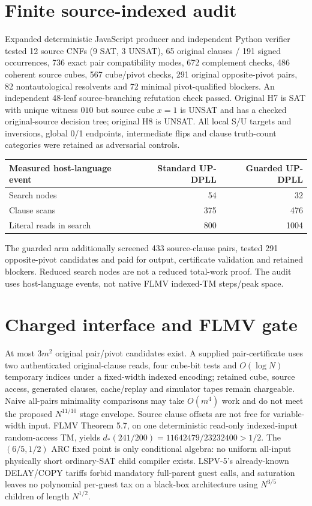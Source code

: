 \documentclass[11pt]{article}
\begin{document}
\section{Finite source-indexed audit}
Expanded deterministic JavaScript producer and independent Python verifier tested 12 source CNFs (9 SAT, 3 UNSAT), 65 original clauses / 191 signed occurrences, 736 exact pair compatibility modes, 672 complement checks, 486 coherent source cubes, 567 cube/pivot checks, 291 original opposite-pivot pairs, 82 nontautological resolvents and 72 minimal pivot-qualified blockers. An independent 48-leaf source-branching refutation check passed. Original H7 is SAT with unique witness $010$ but source cube $x=1$ is UNSAT and has a checked original-source decision tree; original H8 is UNSAT. All local S/U targets and inversions, global 0/1 endpoints, intermediate flips and clause truth-count categories were retained as adversarial controls.
\begin{center}\begin{tabular}{lrr}\toprule
Measured host-language event&Standard UP-DPLL&Guarded UP-DPLL\\\midrule
Search nodes&54&32\\
Clause scans&375&476\\
Literal reads in search&800&1004\\\bottomrule\end{tabular}\end{center}
The guarded arm additionally screened 433 source-clause pairs, tested 291 opposite-pivot candidates and paid for output, certificate validation and retained blockers. Reduced search nodes are not a reduced total-work proof. The audit uses host-language events, not native FLMV indexed-TM steps/peak space.
\section{Charged interface and FLMV gate}
At most $3m^2$ original pair/pivot candidates exist. A supplied pair-certificate uses two authenticated original-clause reads, four cube-bit tests and $O(\log N)$ temporary indices under a fixed-width indexed encoding; retained cube, source access, generated clauses, cache/replay and simulator tapes remain chargeable. Naive all-pairs minimality comparisons may take $O(m^4)$ work and do not meet the proposed $N^{11/10}$ stage envelope. Source clause offsets are not free for variable-width input.
FLMV Theorem 5.7, on one deterministic read-only indexed-input random-access TM, yields $d_*(241/200)=11642479/23232400>1/2$. The $(6/5,1/2)$ ARC fixed point is only conditional algebra: no uniform all-input physically short ordinary-SAT child compiler exists. LSPV-5's already-known DELAY/COPY tariffs forbid mandatory full-parent guest calls, and saturation leaves no polynomial per-guest tax on a black-box architecture using $N^{3/5}$ children of length $N^{1/2}$.
\end{document}
